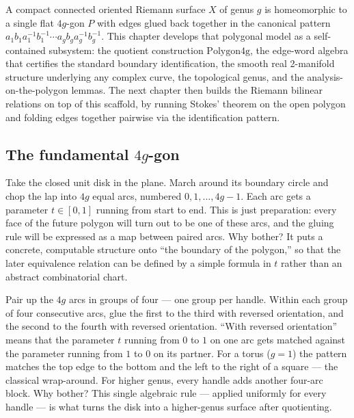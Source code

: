 A compact connected oriented Riemann surface \(X\) of genus \(g\) is
homeomorphic to a single flat \(4g\)-gon \(P\) with edges glued back
together in the canonical pattern
\(a_1b_1a_1^{-1}b_1^{-1}\cdots a_gb_ga_g^{-1}b_g^{-1}\). This chapter
develops that polygonal model as a self-contained subsystem: the
quotient construction \(\mathrm{Polygon4g}\), the edge-word algebra
that certifies the standard boundary identification, the smooth real
2-manifold structure underlying any complex curve, the topological
genus, and the analysis-on-the-polygon lemmas. The next chapter then
builds the Riemann bilinear relations on top of this scaffold, by
running Stokes' theorem on the open polygon and folding edges
together pairwise via the identification pattern.

\subsection{The fundamental \(4g\)-gon}



\begin{layman}
Take the closed unit disk in the plane. March around its boundary
circle and chop the lap into \(4g\) equal arcs, numbered
\(0,1,\ldots,4g-1\). Each arc gets a parameter \(t\in[0,1]\)
running from start to end. This is just preparation: every face of
the future polygon will turn out to be one of these arcs, and the
gluing rule will be expressed as a map between paired arcs. Why
bother? It puts a concrete, computable structure onto ``the
boundary of the polygon,'' so that the later equivalence relation
can be defined by a simple formula in \(t\) rather than an abstract
combinatorial chart.
\end{layman}



\begin{layman}
Pair up the \(4g\) arcs in groups of four --- one group per handle.
Within each group of four consecutive arcs, glue the first to the
third with reversed orientation, and the second to the fourth with
reversed orientation. ``With reversed orientation'' means that the
parameter \(t\) running from \(0\) to \(1\) on one arc gets matched
against the parameter running from \(1\) to \(0\) on its partner.
For a torus (\(g=1\)) the pattern matches the top edge to the bottom
and the left to the right of a square --- the classical wrap-around.
For higher genus, every handle adds another four-arc block. Why
bother? This single algebraic rule --- applied uniformly for every
handle --- is what turns the disk into a higher-genus surface after
quotienting.
\end{layman}



